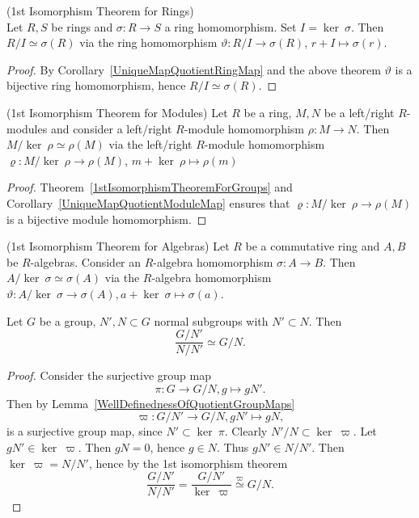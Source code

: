 \begin{corollary}\label{1stIsomorphismTheoremForRings}(1st Isomorphism Theorem for Rings)\\
    Let $R,S$ be rings and $\sigma: R \rightarrow S$ a ring homomorphism. Set $ I= \ker\ \sigma$. Then $R/I \simeq \sigma(R)$ via the ring homomorphism $\vartheta : R/I \rightarrow \sigma(R)$, $r+I \mapsto \sigma(r).$
\end{corollary}
\begin{proof}
    By Corollary~\ref{UniqueMapQuotientRingMap} and the above theorem $\vartheta$ is a bijective ring homomorphism, hence $R/I \simeq \sigma(R)$. 
\end{proof}
\begin{corollary}\label{1stIsomorphismTheoremForModules}(1st Isomorphism Theorem for Modules) Let $R$ be a ring, $M,N$ be a left/right $R$-modules and consider a left/right $R$-module homomorphism $\rho : M \rightarrow N$. Then $M/\ker \ \rho \simeq \rho(M)$ via the left/right $R$-module homomorphism $\varrho : M/\ker \ \rho \rightarrow \rho(M)$, $m + \ker \ \rho \mapsto \rho(m) $ 
\end{corollary}
\begin{proof}
    Theorem~\ref{1stIsomorphismTheoremForGroups} and Corollary~\ref{UniqueMapQuotientModuleMap} ensures that $\varrho : M/\ker\ \rho \rightarrow \rho(M)$ is a bijective module homomorphism.
\end{proof}
\begin{corollary}(1st Isomorphism Theorem for Algebras) Let $R$ be a commutative ring and $A,B$ be $R$-algebras. Consider an $R$-algebra homomorphism $\sigma: A\rightarrow B$. Then $A/\ker\ \sigma \simeq \sigma(A)$ via the $R$-algebra homomorphism $\vartheta : A/\ker\ \sigma \rightarrow \sigma(A), a+\ker\ \sigma \mapsto \sigma(a)$.
\end{corollary}
\begin{proposition}
    Let $G$ be a group, $N',N\subset G$  normal subgroups with $N'\subset N$. Then 
    $$\frac{G/N'}{N/N'}\simeq G/N.$$
\end{proposition}
\begin{proof}
    Consider the surjective group map 
    $$\pi : G \rightarrow G/N, g \mapsto gN'.$$
    Then by Lemma~\ref{WellDefinednessOfQuotientGroupMaps}
    $$\varpi : G/N' \rightarrow G/N, gN'\mapsto gN,$$
    is a surjective group map, since $N'\subset \ker \ \pi$. Clearly $N'/N\subset \ker \ \varpi$. Let $gN'\in \ker\ \varpi$. Then $gN = 0$, hence $g\in N$. Thus $gN' \in N/N'$. Then $\ker \ \varpi = N/N'$, hence by the 1st isomorphism theorem
    $$\frac{G/N'}{N/N'}=\frac{G/N'}{\ker\ \varpi}\overset{\varpi}{\simeq} G/N.$$
\end{proof}
